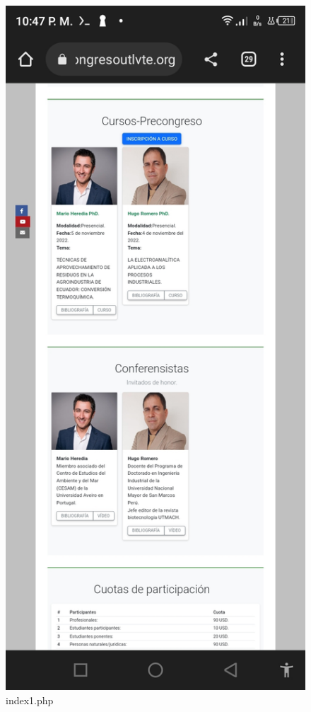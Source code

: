 \documentclass[a4paper,14px]{article}
\begin{document}
\begin{minipage}[H]{0.45\linewidth}
\begin{figure}[H]
  \centering
  \includegraphics[scale=0.3]{index3.jpg}
  \caption{index1.php }
  \label{fig:arquitectura1}
\end{figure}
  
\end{minipage}
\end{document}
